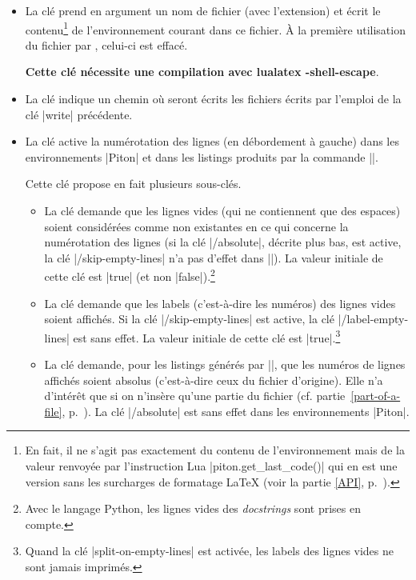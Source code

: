 \documentclass[dvipsnames,svgnames]{article}
\begin{document}
\begin{itemize}
\item {} La clé  prend en argument un nom de fichier (avec
l'extension) et écrit le contenu\footnote{En fait, il ne s'agit pas exactement du contenu
  de l'environnement mais de la valeur renvoyée par l'instruction Lua
  |piton.get_last_code()| qui en est une version sans les surcharges de formatage LaTeX
  (voir la partie \ref{API}, p.~\pageref{API}).} de l'environnement courant dans ce
fichier. À la première utilisation du fichier par , celui-ci est effacé.

{\bfseries Cette clé nécessite une compilation avec {\ttfamily lualatex -shell-escape}}.

\item {} La clé  indique un chemin où seront écrits
les fichiers écrits par l'emploi de la clé |write| précédente.

\item {} La clé  active la numérotation des
lignes (en débordement à gauche) dans les environnements |{Piton}| et dans les listings
produits par la commande |\PitonInputFile|.

Cette clé propose en fait plusieurs sous-clés.
\begin{itemize}
\item La clé  demande que les lignes vides (qui
ne contiennent que des espaces) soient considérées comme non existantes en ce qui concerne
la numérotation des lignes (si la clé |/absolute|, décrite plus bas, est active, la clé
|/skip-empty-lines| n'a pas d'effet dans |\PitonInputFile|). La valeur initiale de cette
clé est |true| (et non |false|).\footnote{Avec le langage Python, les lignes vides des
  \emph{docstrings} sont prises en compte.}

\item La clé  demande que les labels
(c'est-à-dire les numéros) des lignes vides soient affichés. Si la clé |/skip-empty-lines|
est active, la clé |/label-empty-lines| est sans effet. La valeur initiale de cette clé
est |true|.\footnote{Quand la clé |split-on-empty-lines| est activée, les labels des
  lignes vides ne sont jamais imprimés.}

\item La clé  demande, pour les listings générés par
|\PitonInputFile|, que les numéros de lignes affichés soient absolus (c'est-à-dire ceux du
fichier d'origine). Elle n'a d'intérêt que si on n'insère qu'une partie du fichier (cf.
partie~\ref{part-of-a-file}, p.~\pageref{part-of-a-file}). La clé |/absolute| est sans
effet dans les environnements |{Piton}|.


\end{itemize}
\end{itemize}
\end{document}
